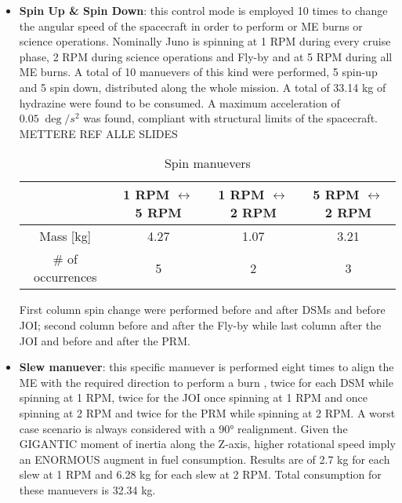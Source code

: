 \begin{itemize}
    \item \textbf{Spin Up \& Spin Down}: this control mode is employed 10 times to change the angular speed of the spacecraft in order to perform or ME burns or science operations. Nominally Juno is spinning at 1 RPM during every cruise phase, 2 RPM during science operations and Fly-by and at 5 RPM during all ME burns. A total of 10 manuevers of this kind were performed, 5 spin-up and 5 spin down, distributed along the whole mission.   A total of 33.14 kg of hydrazine were found to be consumed. A maximum acceleration of $0.05 \; \deg /s^2$ was found, compliant with structural limits of the spacecraft. METTERE REF ALLE SLIDES
    
    \begin{table}[H]
        \renewcommand{\arraystretch}{1.3}
        \centering
        \begin{tabular}{|c|c|c|c|}
            \hline
            &\textbf{1 RPM $\leftrightarrow$ 5 RPM } & \textbf{1 RPM $\leftrightarrow$ 2 RPM } &\textbf{5 RPM $\leftrightarrow$ 2 RPM }\\
            \hline
            \hline
            Mass [kg] & 4.27 & 1.07 & 3.21 \\
            \hline
            \# of occurrences & 5 & 2 & 3 \\
            \hline
        \end{tabular}
        \caption{Spin manuevers}
        \label{table:spin}
    \end{table}

    First column spin change were performed before and after DSMs and before JOI; second column before and after the Fly-by while last column after the JOI and before and after the PRM. 

    \item \textbf{Slew manuever}: this specific manuever is performed eight times to align the ME with the required direction to perform a burn \mref, twice for each DSM while spinning at 1 RPM, twice for the JOI once spinning at 1 RPM and once spinning at 2 RPM and twice for the PRM while spinning at 2 RPM. A worst case scenario is always considered with a 90° realignment.  
    Given the GIGANTIC moment of inertia along the Z-axis, higher rotational speed imply an ENORMOUS augment in fuel consumption. Results are of 2.7 kg for each slew at 1 RPM and 6.28 kg for each slew at 2 RPM.  Total consumption for these manuevers is 32.34 kg. 
    
    

\end{itemize}




